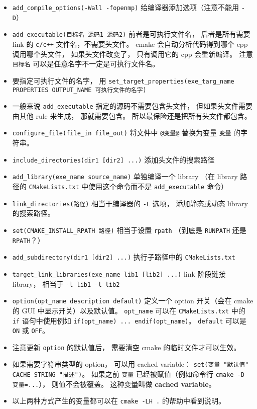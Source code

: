 \begin{itemize}
\item \verb|add_compile_options(-Wall -fopenmp)| 给编译器添加选项（注意不能用 \verb|-D|）
\item \verb`add_executable(目标名 源码1 源码2)` 前者是可执行文件名， 后者是所有需要 link 的 \verb|c/c++| 文件名，不需要头文件。 cmake 会自动分析代码得到哪个 cpp 调用哪个头文件， 如果头文件改变了， 只有调用它的 cpp 会重新编译。 注意 \verb|目标名| 可以是任意名字不一定是可执行文件名。
\item 要指定可执行文件的名字， 用 \verb|set_target_properties(exe_targ_name PROPERTIES OUTPUT_NAME 可执行文件的名字)|
\item 一般来说 \verb|add_executable| 指定的源码不需要包含头文件， 但如果头文件需要由其他 rule 来生成， 那就需要包含。 所以最保险还是把所有头文件都包含。
\item \verb`configure_file(file_in file_out)` 将文件中 \verb`@变量@` 替换为变量 \verb`变量` 的字符串。
\item \verb`include_directories(dir1 [dir2] ...)` 添加头文件的搜索路径
\item \verb`add_library(exe_name source_name)` 单独编译一个 library （在 library 路径的 \verb|CMakeLists.txt| 中使用这个命令而不是 \verb`add_executable` 命令）
\item \verb|link_directories(路径)| 相当于编译器的 \verb`-L` 选项， 添加静态或动态 library 的搜索路径。
\item \verb|set(CMAKE_INSTALL_RPATH 路径)| 相当于设置 \verb|rpath| （到底是 \verb|RUNPATH| 还是 \verb|RPATH|？）
\item \verb`add_subdirectory(dir1 [dir2] ...)` 执行子路径中的 \verb|CMakeLists.txt|
\item \verb`target_link_libraries(exe_name lib1 [lib2] ...)` link 阶段链接 library， 相当于 \verb|-l lib1 -l lib2|
\item \verb`option(opt_name description default)` 定义一个 option 开关（会在 cmake 的 GUI 中显示开关）以及默认值。 \verb`opt_name` 可以在 \verb|CMakeLists.txt| 中的 \verb`if` 语句中使用例如 \verb`if(opt_name) ... endif(opt_name)`。 \verb`default` 可以是 \verb`ON` 或 \verb`OFF`。
\item 注意更新 \verb|option| 的默认值后， 需要清空 cmake 的临时文件才可以生效。
\item 如果需要字符串类型的 option， 可以用 cached variable： \verb|set(变量 "默认值" CACHE STRING "描述")|。 如果之前 \verb|变量| 已经被赋值（例如命令行 \verb|cmake -D 变量=...|）， 则值不会被覆盖。 这种变量叫做 \textbf{cached variable}。
\item 以上两种方式产生的变量都可以在 \verb|cmake -LH .| 的帮助中看到说明。

\end{itemize}
